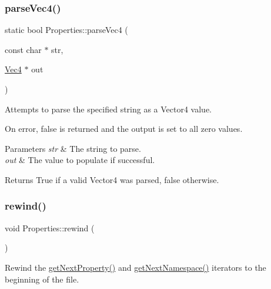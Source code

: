 \subsubsection{\texorpdfstring{parse\+Vec4()}{parseVec4()}\hspace{0.1cm}{\footnotesize\ttfamily [2/2]}}
{\footnotesize\ttfamily static bool Properties\+::parse\+Vec4 (\begin{DoxyParamCaption}\item[{const char $\ast$}]{str,  }\item[{\hyperlink{classVec4}{Vec4} $\ast$}]{out }\end{DoxyParamCaption})\hspace{0.3cm}{\ttfamily [static]}}

Attempts to parse the specified string as a Vector4 value.

On error, false is returned and the output is set to all zero values.


\begin{DoxyParams}{Parameters}
{\em str} & The string to parse. \\
\hline
{\em out} & The value to populate if successful.\\
\hline
\end{DoxyParams}
\begin{DoxyReturn}{Returns}
True if a valid Vector4 was parsed, false otherwise. 
\end{DoxyReturn}
\mbox{\label{classProperties_a5a6eab78915d41d3be2f5b65ee03539d}} 
\subsubsection{\texorpdfstring{rewind()}{rewind()}\hspace{0.1cm}{\footnotesize\ttfamily [1/2]}}
{\footnotesize\ttfamily void Properties\+::rewind (\begin{DoxyParamCaption}{ }\end{DoxyParamCaption})}

Rewind the \hyperlink{classProperties_a396aad2d114059ca157db26c511da196}{get\+Next\+Property()} and \hyperlink{classProperties_af3933a1797582540f81ef13a981801d3}{get\+Next\+Namespace()} iterators to the beginning of the file. \mbox{\label{classProperties_a5a6eab78915d41d3be2f5b65ee03539d}} 
